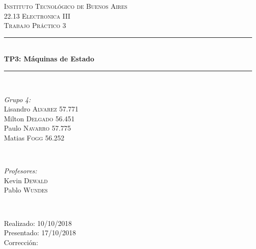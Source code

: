 \begin{titlepage}
\newcommand{\HRule}{\rule{\linewidth}{0.5mm}}
\center
\textsc{\LARGE Instituto Tecnológico de Buenos Aires}\\[1.5cm]
\textsc{\Large 22.13 Electronica III}\\[0.5cm]
\textsc{\large Trabajo Práctico 3}\\[0.5cm]

\HRule \\[0.4cm]
{ \huge \bfseries TP3: Máquinas de Estado}\\[0.4cm] %
\HRule \\[1.5cm]

\begin{minipage}{0.4\textwidth}
\begin{flushleft} \large
\emph{Grupo 4:}\\
Lisandro \textsc{Alvarez} 57.771\\
Milton \textsc{Delgado} 56.451\\
Paulo \textsc{Navarro} 57.775\\
Matias \textsc{Fogg} 56.252\\
\end{flushleft}
\end{minipage}
~
\begin{minipage}{0.4\textwidth}
\begin{flushright} \large
\emph{Profesores:} \\
Kevin \textsc{Dewald}\\
Pablo \textsc{Wundes}
\end{flushright}
\end{minipage}\\[4cm]

\begin{minipage}{0.4\textwidth}
\begin{flushleft} \large
Realizado: 10/10/2018\\
Presentado: 17/10/2018\\
Corrección:\\
\end{flushleft}
\end{minipage}
\vfill %

\end{titlepage}